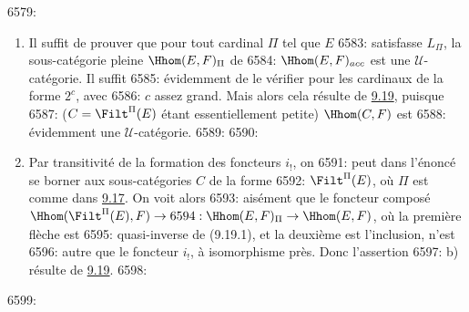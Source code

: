 6579: \begin{enumerate}
6580: \renewcommand{\theenumi}{\alph{enumi}}
6581: \renewcommand{\labelenumi}{\theenumi)}
6582: \item Il suffit de prouver que pour tout cardinal $\Pi$ tel que $E$
6583: satisfasse $L_{\Pi}$, la sous-catégorie pleine $\Hhom(E,F)_{\Pi}$ de
6584: $\Hhom(E,F)_{acc}$ est une $𝒰$-catégorie. Il suffit
6585: évidemment de le vérifier pour les cardinaux de la forme $2^c$, avec
6586: $c$ assez grand. Mais alors cela résulte de \hyperref[I.cor9.19]{9.19}, puisque
6587: ($C=\Filt^{\Pi}(E)$ étant essentiellement petite) $\Hhom(C,F)$ est
6588: évidemment une $𝒰$-catégorie.
6589: 
6590: \item Par transitivité de la formation des foncteurs $i_{!}$, on
6591: peut dans l'énoncé se borner aux sous-catégories $C$ de la forme
6592: $\Filt^{\Pi}(E)$, où $\Pi$ est comme dans \hyperref[I.cor9.17]{9.17}. On voit alors
6593: aisément que le foncteur composé $\Hhom(\Filt^{\Pi}(E),F)\rightarrow
6594: \Hhom(E,F)_{\Pi}\rightarrow \Hhom(E,F)$, où la première flèche est
6595: quasi-inverse de (9.19.1), et la deuxième est l'inclusion, n'est
6596: autre que le foncteur $i_{!}$, à isomorphisme près. Donc l'assertion
6597: b) résulte de \hyperref[I.cor9.19]{9.19}.
6598: \end{enumerate}
6599: 
